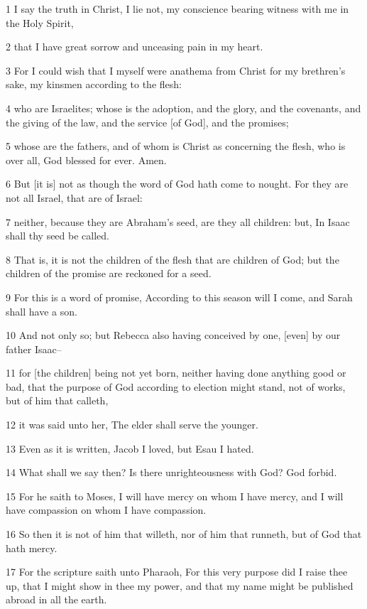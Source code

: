 \par 1 I say the truth in Christ, I lie not, my conscience bearing witness with me in the Holy Spirit,
\par 2 that I have great sorrow and unceasing pain in my heart.
\par 3 For I could wish that I myself were anathema from Christ for my brethren's sake, my kinsmen according to the flesh:
\par 4 who are Israelites; whose is the adoption, and the glory, and the covenants, and the giving of the law, and the service [of God], and the promises;
\par 5 whose are the fathers, and of whom is Christ as concerning the flesh, who is over all, God blessed for ever. Amen.
\par 6 But [it is] not as though the word of God hath come to nought. For they are not all Israel, that are of Israel:
\par 7 neither, because they are Abraham's seed, are they all children: but, In Isaac shall thy seed be called.
\par 8 That is, it is not the children of the flesh that are children of God; but the children of the promise are reckoned for a seed.
\par 9 For this is a word of promise, According to this season will I come, and Sarah shall have a son.
\par 10 And not only so; but Rebecca also having conceived by one, [even] by our father Isaac--
\par 11 for [the children] being not yet born, neither having done anything good or bad, that the purpose of God according to election might stand, not of works, but of him that calleth,
\par 12 it was said unto her, The elder shall serve the younger.
\par 13 Even as it is written, Jacob I loved, but Esau I hated.
\par 14 What shall we say then? Is there unrighteousness with God? God forbid.
\par 15 For he saith to Moses, I will have mercy on whom I have mercy, and I will have compassion on whom I have compassion.
\par 16 So then it is not of him that willeth, nor of him that runneth, but of God that hath mercy.
\par 17 For the scripture saith unto Pharaoh, For this very purpose did I raise thee up, that I might show in thee my power, and that my name might be published abroad in all the earth.
